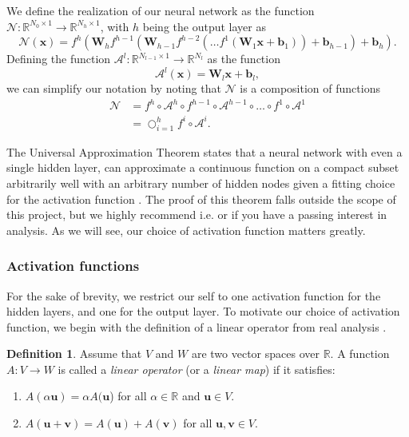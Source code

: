 \documentclass{article}
\theoremstyle{definition}
\newtheorem{definition}{Definition}[subsection]
\begin{document}
We define the realization of our neural network as the function $\mathcal{N}: \mathbb{R}^{N_0 \times 1} \to \mathbb{R}^{N_h \times 1}$, with $h$ being the output layer as
\begin{equation*}
    \mathcal{N}(\boldsymbol{x}) =
    f^h\left(
    \mathbf{W}_h f^{h-1} \left(
    \mathbf{W}_{h-1}f^{h-2} \left(\ldots f^1\left( \mathbf{W}_1 \boldsymbol{x} + \mathbf{b}_1 \right) \right)
    + \mathbf{b}_{h-1} \right) 
    + \mathbf{b}_h \right).
\end{equation*}
Defining the function $\mathcal{A}^l: \mathbb{R}^{N_{l-1} \times 1} \to \mathbb{R}^{N_{l}}$ as the function
\begin{equation*}
    \mathcal{A}^l (\boldsymbol{x}) = \mathbf{W}_l \boldsymbol{x} + \mathbf{b}_l,
\end{equation*}
we can simplify our notation by noting that $\mathcal{N}$ is a composition of functions
\begin{align*}
    \mathcal{N} &= f^h \circ \mathcal{A}^h \circ f^{h-1} \circ \mathcal{A}^{h-1} \circ \ldots \circ f^1 \circ \mathcal{A}^1 \\
    &= \bigcirc_{i = 1}^h f^{i} \circ \mathcal{A}^{i}.
\end{align*}

The Universal Approximation Theorem states that a neural network with even a single hidden layer, can approximate a continuous function on a compact subset arbitrarily well with an arbitrary number of hidden nodes given a fitting choice for the activation function \parencite{universalapprox}. The proof of this theorem falls outside the scope of this project, but we highly recommend i.e. \textcite{Guliyev2015ASH} or \textcite{universalapprox} if you have a passing interest in analysis. As we will see, our choice of activation function matters greatly.

\subsubsection{Activation functions}
For the sake of brevity, we restrict our self to one activation function for the hidden layers, and one for the output layer. To motivate our choice of activation function, we begin with the definition of a linear operator from real analysis \parencite[p.~150]{lindstrom2017spaces}.

\begin{definition}
    Assume that $V$ and $W$ are two vector spaces over $\mathbb{R}$. A function $A: V \to W$ is called a \textit{linear operator} (or a \textit{linear map}) if it satisfies:
    \begin{enumerate}[label=(\roman*)]
        \item $A(\alpha\boldsymbol{u}) = \alpha A(\boldsymbol{u}$) for all $\alpha \in \mathbb{R}$ and $\boldsymbol{u} \in V$.

        \item $A(\boldsymbol{u} + \boldsymbol{v}) = A(\boldsymbol{u}) + A(\boldsymbol{v})$ for all $\boldsymbol{u}, \boldsymbol{v} \in V$.
    \end{enumerate}
\end{definition}
\end{document}
